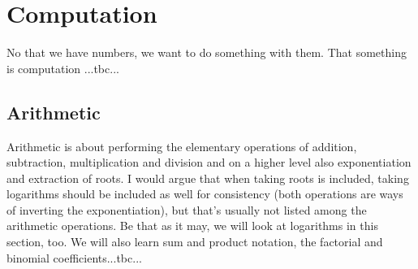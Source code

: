 \section{Computation}
No that we have numbers, we want to do something with them. That something is computation ...tbc...

\subsection{Arithmetic}
Arithmetic is about performing the elementary operations of addition, subtraction, multiplication and division and on a higher level also exponentiation and extraction of roots. I would argue that when taking roots is included, taking logarithms should be included as well for consistency (both operations are ways of inverting the exponentiation), but that's usually not listed among the arithmetic operations. Be that as it may, we will look at logarithms in this section, too. We will also learn sum and product notation, the factorial and binomial coefficients...tbc...



%
%



\begin{comment}

ToDo:

-introduce positional number systems, in particular decimal and maybe binary as alternative
-give algorithms for long addition, subtraction, multiplication, division
-maybe also for numbers in scientific notation, i.e. floating point numbers
-introduce sum and product notation
 -maybe with a spoiler to infinite sums, use $\sum_{k=1}^{\infty} (1/10)^k = 0.1111... = 1/9$ as example
-introduce sums, products, factorials and binomial coefficients
-but maybe that stuff should go into the "Elementary Algebra" section because it involves 
 variables

References:

https://en.wikipedia.org/wiki/Arithmetic
https://www.britannica.com/science/arithmetic
https://en.wikipedia.org/wiki/Positional_notation
https://en.wikipedia.org/wiki/Mixed_radix


\end{comment}


